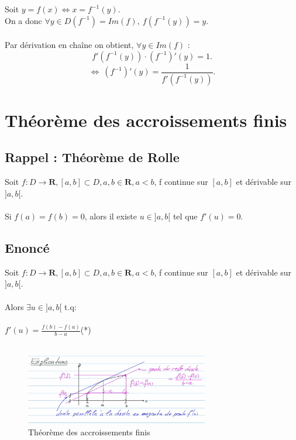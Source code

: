\documentclass{article}
\begin{document}
Soit $ y = f(x) \Leftrightarrow x = f^{-1}(y) $.\\
On a donc $ \forall y \in D(f^{-1}) = Im(f),\ f(f^{-1}(y)) = y $.\\\\
Par dérivation en chaîne on obtient, $ \forall y \in Im(f) $ :
\[ f'(f^{-1}(y)) \cdot (f^{-1})'(y) = 1. \]
\[ \Leftrightarrow \ (f^{-1})'(y) = \frac{1}{f'(f^{-1}(y))}. \]

\newpage

\section{Théorème des accroissements finis}

\subsection{Rappel : Théorème de Rolle}

Soit $ f : D \to \mathbf{R}, [a,b] \subset D, a, b \in \mathbf{R}, a < b $, f continue sur $ [a, b] $ et dérivable sur $]a, b[$.\\\\
Si $ f(a) = f(b) = 0 $, alors il existe $ u \in ]a, b[ $ tel que $ f'(u) = 0 $.

\subsection{Enoncé}

Soit $ f : D \to \mathbf{R}, [a,b] \subset D, a, b \in \mathbf{R}, a < b $, f continue sur $ [a, b] $ et dérivable sur $]a, b[$.\\\\
Alors $ \exists u \in ]a, b[$ t.q:\\\\
$ f'(u) = \frac{f(b) -f(a)}{b - a}$(*)\\\\
\begin{figure}[htp]
    \centering
    \includegraphics[width=8cm]{Images/accroissements.png}
    \caption{Théorème des accroissements finis}
\end{figure}
\end{document}
